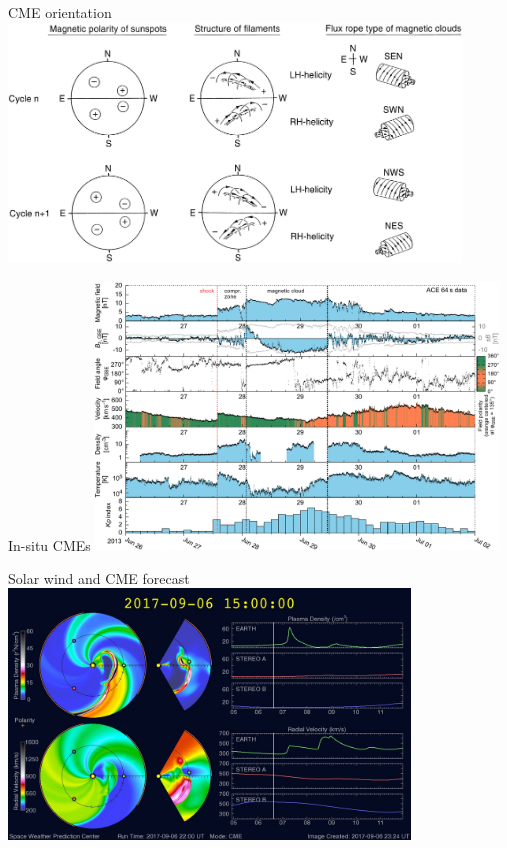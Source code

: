 \begin{frame}[plain,c]{CME orientation}{}
	\centering
	\includegraphics[width=0.9\textwidth]{../figures_of_others/images/Bothmer1998_fig18.png}
\end{frame}
\begin{frame}[plain,c]{In-situ CMEs}{}
	\centering
	\includegraphics[width=0.8\textwidth]{../figures_of_mine/gnuplots/ACE_64s_v7_thesis_CME_2013-6-26_6.pdf}
\end{frame}
\begin{frame}[plain,c]{Solar wind and CME forecast}{}
	\centering
	\includegraphics[width=0.8\textwidth]{../figures_of_others/images/enlil_com1_20170906T150000.jpg}
\end{frame}


